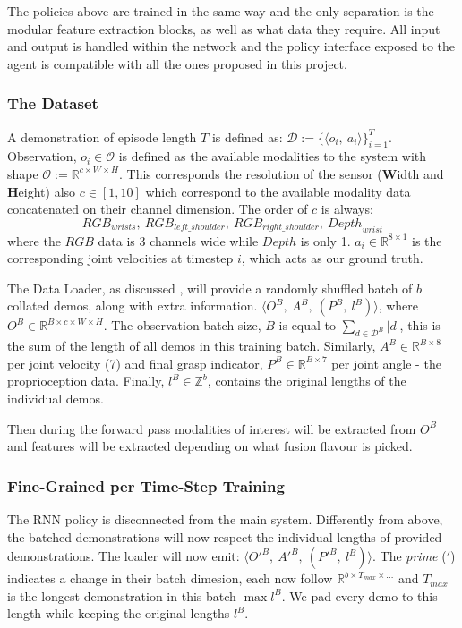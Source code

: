 The policies above are trained in the same way and the only separation is the modular feature extraction blocks, as well as what data they require. All input and output is handled within the network and the policy interface exposed to the agent is compatible with all the ones proposed in this project.

\subsubsection{The Dataset}
A demonstration of episode length $T$ is defined as: \(\mathcal{D} := \{\langle o_i, ~a_i\rangle\}_{i = 1}^{T} \). Observation, \(o_i \in \mathcal{O}\) is defined as the available modalities to the system with shape \(\mathcal{O} := \mathbb{R}^{c \times W \times H}\). This corresponds the resolution of the sensor (\textbf{W}idth and \textbf{H}eight) also $c \in \left[1, 10\right]$ which correspond to the available modality data concatenated on their channel dimension. The order of $c$ is always:
\[
{RGB}_{wrists}, ~{RGB}_{{left}\_{shoulder}}, ~{RGB}_{{right}\_{shoulder}}, ~{Depth}_{wrist}
\] 
where the $RGB$ data is $3$ channels wide while $Depth$ is only 1. \(a_i \in \mathbb{R}^{8 \times 1}\) is the corresponding joint velocities at timestep $i$, which acts as our ground truth. 

The Data Loader, as discussed , will provide a randomly shuffled batch of $b$ collated demos, along with extra information. \( \langle O^B, ~A^B, ~\left( P^B, ~l^B \right) \rangle\), where \(O^B \in \mathbb{R}^{ B \times c \times W \times H}\). The observation batch size, $B$ is equal to \({\sum_{ d \in \mathcal{D}^B}|d|}\), this is the sum of the length of all demos in this training batch. Similarly, \(A^B \in \mathbb{R}^{B \times 8}\) per joint velocity (7) and final grasp indicator, \(P^B \in \mathbb{R}^{B \times 7}\) per joint angle - the proprioception data. Finally, \(l^B \in \mathbb{Z}^{b}\), contains the original lengths of the individual demos.

Then during the forward pass modalities of interest will be extracted from $O^B$ and features will be extracted depending on what fusion flavour is picked.



\subsubsection{Fine-Grained per Time-Step Training}
The RNN policy is disconnected from the main system. Differently from above, the batched demonstrations will now respect the individual lengths of provided demonstrations. The loader will now emit: \( \langle {O'}^B, ~{A'}^B, ~\left( {P'}^B, ~l^B \right) \rangle\). The \emph{prime} ($'$) indicates a change in their batch dimesion, each now follow $\mathbb{R}^{b \times T_{max} \times \ldots}$ and  $T_{max}$ is the longest demonstration in this batch \(\max l^{B}\). We pad every demo to this length while keeping the original lengths $l^{B}$.

